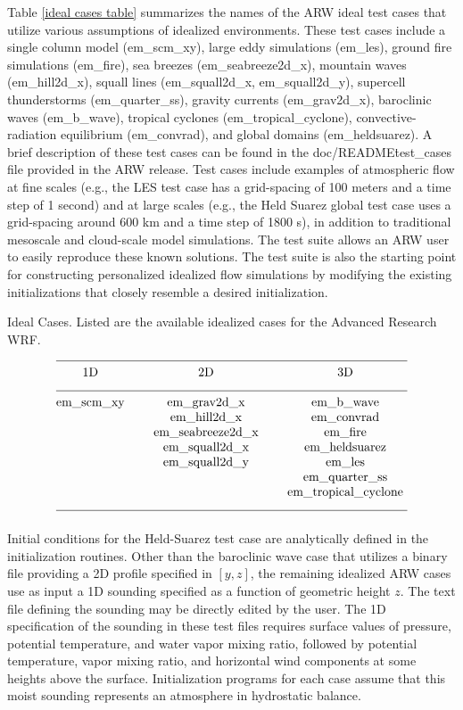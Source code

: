 Table \ref {ideal cases table} summarizes the names of the ARW ideal test cases that
utilize various assumptions of idealized environments.
These test cases include
a single column model (em\_scm\_xy), 
large eddy simulations (em\_les), ground fire simulations (em\_fire),
sea breezes (em\_seabreeze2d\_x), mountain waves (em\_hill2d\_x), squall lines
(em\_squall2d\_x, em\_squall2d\_y), supercell thunderstorms
(em\_quarter\_ss), gravity currents (em\_grav2d\_x), baroclinic
waves (em\_b\_wave), tropical cyclones (em\_tropical\_cyclone), 
convective-radiation equilibrium (em\_convrad), and 
global domains (em\_heldsuarez).  
A brief description of these test cases can be
found in the doc/README\.test\_cases file provided in the ARW release.
Test cases include examples of atmospheric
flow at fine scales (e.g., the LES test case has a grid-spacing of
100 meters and a time step of 1 second) and at large
scales (e.g., the Held Suarez global test case uses a grid-spacing around 600 km and
a time step of 1800 s), in addition to traditional mesoscale and
cloud-scale model simulations.  The test suite allows an ARW user to
easily reproduce these known solutions.  The test suite is also the
starting point for constructing personalized idealized flow simulations by modifying
the existing initializations that closely resemble a desired initialization.

\begin{table}
\caption{Ideal Cases. Listed are the available idealized cases for the Advanced Research WRF.}
\label{ideal cases table}
$$\vbox
{\halign{\hfil#\hfil \qquad & \hfil#\hfil \qquad & \hfil#\hfil \cr
\multispan3\hrulefill \cr
 1D             & 2D                  & 3D                    \cr
\multispan3\hrulefill \cr
em\_scm\_xy     &  em\_grav2d\_x      & em\_b\_wave           \cr
                &  em\_hill2d\_x      & em\_convrad           \cr
                &  em\_seabreeze2d\_x & em\_fire              \cr
                &  em\_squall2d\_x    & em\_heldsuarez      \cr
                &  em\_squall2d\_y    & em\_les               \cr
                &                     & em\_quarter\_ss       \cr
                &                     & em\_tropical\_cyclone \cr
\multispan3\hrulefill \cr
}}$$
\end{table}

Initial conditions for the Held-Suarez test case are analytically
defined in the initialization routines. Other than the baroclinic wave case
that utilizes a binary file providing a 2D profile specified in $[y,z]$, the remaining
idealized ARW cases use as input a 1D sounding specified as a function of
geometric height $z$. The text file defining the sounding may be
directly edited by the user.  
The 1D specification of the sounding in
these test files requires surface values of pressure, potential
temperature, and water vapor mixing ratio, followed by potential
temperature, vapor mixing ratio, and horizontal wind components at some
heights above the surface.  Initialization programs for each case
assume that this moist sounding represents an atmosphere in hydrostatic
balance.

